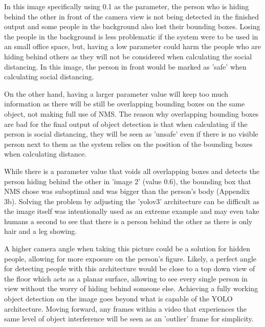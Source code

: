 \documentclass[12pt]{report}
\begin{document}
\vspace{2mm}

In this image specifically using 0.1 as the parameter, the person who is hiding behind the other in front of the camera view is not being detected in the finished output and some people in the background also lost their bounding boxes. Losing the people in the background is less problematic if the system were to be used in an small office space, but, having a low parameter could harm the people who are hiding behind others as they will not be considered when calculating the social distancing. In this image, the person in front would be marked as 'safe' when calculating social distancing.

\vspace{2mm}

On the other hand, having a larger parameter value will keep too much information as there will be still be overlapping bounding boxes on the same object, not making full use of NMS. The reason why overlapping bounding boxes are bad for the final output of object detection is that when calculating if the person is social distancing, they will be seen as 'unsafe' even if there is no visible person next to them as the system relies on the position of the bounding boxes when calculating distance.

\vspace{2mm}

While there is a parameter value that voids all overlapping boxes and detects the person hiding behind the other in 'image 2' (value 0.6), the bounding box that NMS chose was suboptimal and was bigger than the person's body (Appendix 3b). Solving the problem by adjusting the 'yolov3' architecture can be difficult as the image itself was intentionally used as an extreme example and may even take humans a second to see that there is a person behind the other as there is only hair and a leg showing.

\vspace{2mm}

A higher camera angle when taking this picture could be a solution for hidden people, allowing for more exposure on the person's figure. Likely, a perfect angle for detecting people with this architecture would be close to a top down view of the floor which acts as a planar surface, allowing to see every single person in view without the worry of hiding behind someone else. Achieving a fully working object detection on the image goes beyond what is capable of the YOLO architecture. Moving forward, any frames within a video that experiences the same level of object interference will be seen as an 'outlier' frame for simplicity. 
\end{document}
